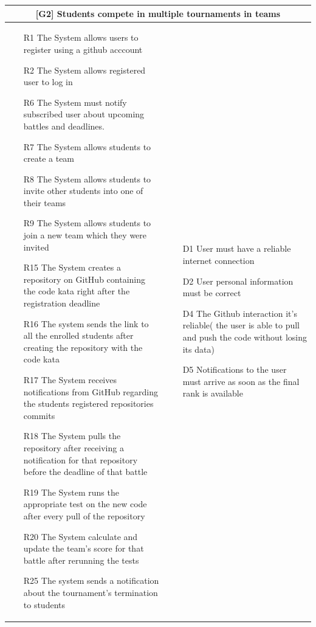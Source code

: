 \begin{tabular}{|p{7cm}|p{7cm}|}
\hline
\multicolumn{2}{|c|}{
\textbf{[G2] Students compete in multiple tournaments in teams} }
\\
\hline
\begin{itemize}
    \item [R1] The System allows users to register using a github acccount
    \item [R2] The System allows registered user to log in
    \item [R6] The System must notify subscribed user about upcoming battles and deadlines.
    \item [R7] The System allows students to create a team
    \item [R8] The System allows students to invite other students into one of their teams
    \item [R9] The System allows students to join a new team which they were invited
    \item [R15] The System creates a repository on GitHub containing the code kata right after the registration deadline
    \item [R16] The system sends the link to all the enrolled students after creating the repository with the code kata
    \item [R17] The System receives notifications from GitHub regarding the students registered repositories commits
    \item [R18] The System pulls the repository after receiving a notification for that repository before the deadline of that battle
    \item [R19] The System runs the appropriate test on the new code after every pull of the repository
    \item [R20] The System calculate and update the team's score for that battle after rerunning the tests
    \item [R25] The system  sends a notification about the tournament's termination to students
\end{itemize}
&
\begin{itemize}
    \item [D1] User must have a reliable internet connection
    \item [D2] User personal information must be correct
    \item [D4] The Github interaction it's reliable( the user is able to pull and push the code without losing its data)
    \item [D5] Notifications to the user must arrive as soon as the final rank is available
\end{itemize}
\\
\hline
\end{tabular}

